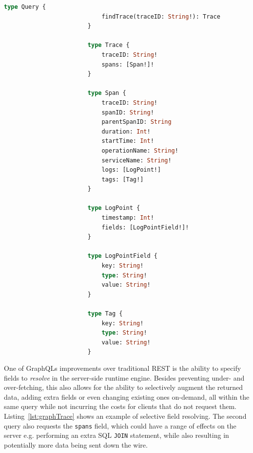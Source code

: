 \documentclass[12pt,pdftex,titlepage]{report}
\begin{document}
                    \newpage
                    \begin{lstlisting}[caption={The base GraphQL schema, defining a query and data types for the trace data.}, language=GraphQL, gobble=24]
                        type Query {
                            findTrace(traceID: String!): Trace
                        }

                        type Trace {
                            traceID: String!
                            spans: [Span!]!
                        }

                        type Span {
                            traceID: String!
                            spanID: String!
                            parentSpanID: String
                            duration: Int!
                            startTime: Int!
                            operationName: String!
                            serviceName: String!
                            logs: [LogPoint!]
                            tags: [Tag!]
                        }

                        type LogPoint {
                            timestamp: Int!
                            fields: [LogPointField!]!
                        }

                        type LogPointField {
                            key: String!
                            type: String!
                            value: String!
                        }

                        type Tag {
                            key: String!
                            type: String!
                            value: String!
                        }
                    \end{lstlisting}
                    \bigskip
                    
                    One of GraphQLs improvements over traditional REST is the ability to specify fields to \textit{resolve} in the server-side runtime engine. Besides preventing
                    under- and over-fetching, this also allows for the ability to selectively augment the returned data, adding extra fields or even changing existing ones on-demand,
                    all within the same query while not incurring the costs for clients that do not request them. Listing~\ref{lst:graphTrace} shows an example of selective field
                    resolving. The second query also requests the \texttt{spans} field, which could have a range of effects on the server e.g. performing an extra SQL \texttt{JOIN}
                    statement, while also resulting in potentially more data being sent down the wire.
\end{document}
